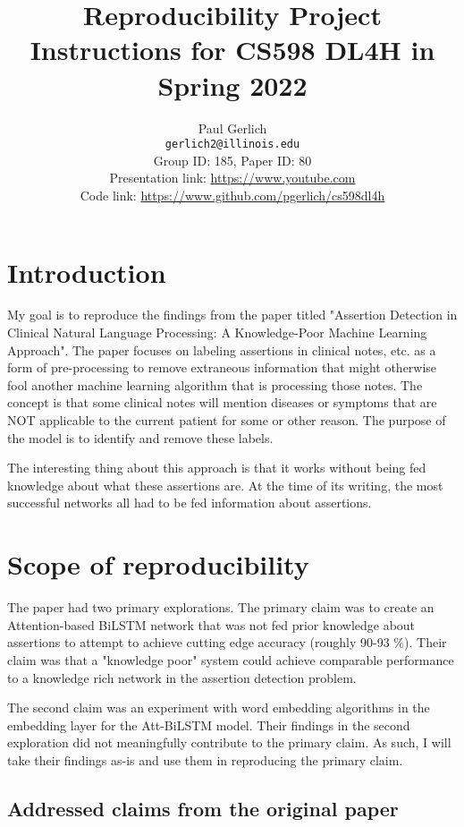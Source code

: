 \documentclass[11pt,a4paper]{article}
\title{Reproducibility Project Instructions for CS598 DL4H in Spring 2022}
\author{Paul Gerlich \\
  \texttt{gerlich2@illinois.edu}
  \\[2em]
  Group ID: 185, Paper ID: 80\\
  Presentation link: \url{https://www.youtube.com} \\
  Code link: \url{https://www.github.com/pgerlich/cs598dl4h}}
\begin{document}
\maketitle


\section{Introduction}
My goal is to reproduce the findings from the paper titled "Assertion Detection in Clinical Natural Language Processing: A Knowledge-Poor Machine Learning Approach". The paper focuses on labeling assertions in clinical notes, etc. as a form of pre-processing to remove extraneous information that might otherwise fool another machine learning algorithm that is processing those notes. The concept is that some clinical notes will mention diseases or symptoms that are NOT applicable to the current patient for some or other reason. The purpose of the model is to identify and remove these labels.

The interesting thing about this approach is that it works without being fed knowledge about what these assertions are. At the time of its writing, the most successful networks all had to be fed information about assertions.

\section{Scope of reproducibility}

The paper had two primary explorations. The primary claim was to create an Attention-based BiLSTM network that was not fed prior knowledge about assertions to attempt to achieve cutting edge accuracy (roughly 90-93 \%). Their claim was that a "knowledge poor" system could achieve comparable performance to a knowledge rich network in the assertion detection problem. 

The second claim was an experiment with word embedding algorithms in the embedding layer for the Att-BiLSTM model. Their findings in the second exploration did not meaningfully contribute to the primary claim. As such, I will take their findings as-is and use them in reproducing the primary claim.

\subsection{Addressed claims from the original paper}
\end{document}
